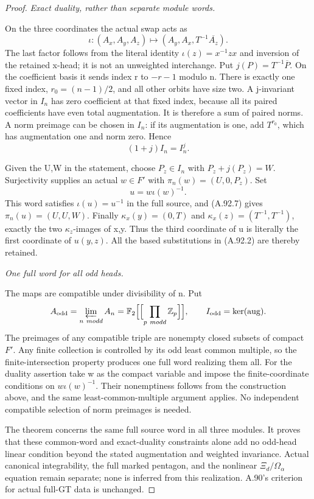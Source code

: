 \begin{proof}
\emph{Exact duality, rather than separate module words.}\par
On the three coordinates the actual swap acts as
\[
 \iota:(A_x,A_y,A_z)\longmapsto
                   (A_y,A_x,T^{-1}\overline{A_z}).
\tag{A.92.7}
\]
The last factor follows from the literal identity
\(\iota(z)=x^{-1}zx\) and inversion of the retained x-head;
it is not an unweighted interchange. Put
\(j(P)=T^{-1}\overline P\). On the coefficient basis it
sends index r to \(-r-1\) modulo n. There is exactly one
fixed index, \(r_0=(n-1)/2\), and all other orbits have size
two. A j-invariant vector in \(I_n\) has zero coefficient
at that fixed index, because all its paired coefficients have
even total augmentation. It is therefore a sum of paired norms.
A norm preimage can be chosen in \(I_n\): if its augmentation
is one, add \(T^{r_0}\), which has augmentation one and norm
zero. Hence
\[
                         (1+j)I_n=I_n^j.
\tag{A.92.8}
\]

Given the U,W in the statement, choose \(P_z\in I_n\) with
\(P_z+j(P_z)=W\). Surjectivity supplies an actual
\(w\in F'\) with \(\pi_n(w)=(U,0,P_z)\). Set
\[
                              u=w\iota(w)^{-1}.
\]
This word satisfies \(\iota(u)=u^{-1}\) in the full source,
and (A.92.7) gives \(\pi_n(u)=(U,U,W)\).
Finally \(\kappa_x(y)=(0,T)\) and
\(\kappa_x(z)=(T^{-1},T^{-1})\), exactly the two
\(\kappa_z\)-images of x,y. Thus the third coordinate of
u is literally the first coordinate of \(u(y,z)\).
All the based substitutions in (A.92.2) are thereby retained.

\emph{One full word for all odd heads.}\par
The maps are compatible under divisibility of n. Put
\[
 A_{\rm odd}=\varprojlim_{n\ {
m odd}}A_n
   =\mathbb F_2\Bigl[\Bigl[\prod_{p\ {
m odd}}\mathbb Z_p\Bigr]\Bigr],
 \qquad I_{\rm odd}=\ker(\operatorname{aug}).
\]
The preimages of any compatible triple are nonempty closed
subsets of compact \(F'\). Any finite collection is controlled
by its odd least common multiple, so the finite-intersection
property produces one full word realizing them all.
For the duality assertion take w as the compact variable and
impose the finite-coordinate conditions on
\(w\iota(w)^{-1}\). Their nonemptiness follows from the
construction above, and the same least-common-multiple argument
applies. No independent compatible selection of norm preimages
is needed.

The theorem concerns the same full source word in all three
modules. It proves that these common-word and exact-duality
constraints alone add no odd-head linear condition beyond the
stated augmentation and weighted invariance. Actual canonical
integrability, the full marked pentagon, and the nonlinear
\(\Xi_d/\Omega_\alpha\) equation remain separate; none is
inferred from this realization. A.90's criterion for actual
full-GT data is unchanged.
\end{proof}
